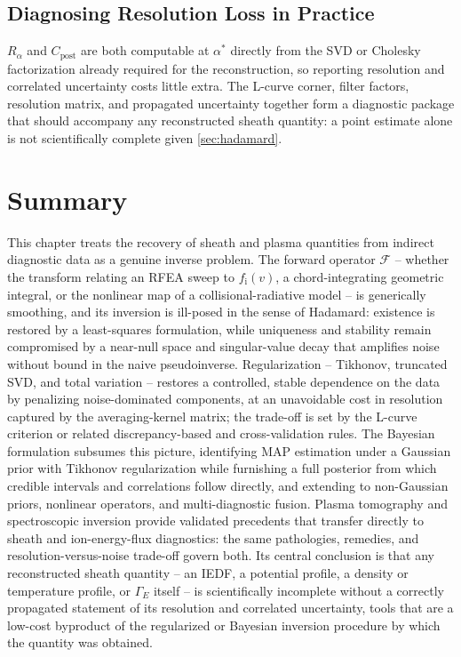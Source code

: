 \subsection{Diagnosing Resolution Loss in Practice}

$R_{\alpha}$ and $C_{\mathrm{post}}$ are both computable at $\alpha^{\ast}$ directly from the SVD or Cholesky factorization already required for the reconstruction, so reporting resolution and correlated uncertainty costs little extra. The L-curve corner, filter factors, resolution matrix, and propagated uncertainty together form a diagnostic package that should accompany any reconstructed sheath quantity: a point estimate alone is not scientifically complete given \cref{sec:hadamard}.

\section{Summary}

This chapter treats the recovery of sheath and plasma quantities from indirect diagnostic data as a genuine inverse problem. The forward operator $\mathcal{F}$ -- whether the transform relating an RFEA sweep to $f_{\mathrm{i}}(v)$, a chord-integrating geometric integral, or the nonlinear map of a collisional-radiative model -- is generically smoothing, and its inversion is ill-posed in the sense of Hadamard: existence is restored by a least-squares formulation, while uniqueness and stability remain compromised by a near-null space and singular-value decay that amplifies noise without bound in the naive pseudoinverse. Regularization -- Tikhonov, truncated SVD, and total variation -- restores a controlled, stable dependence on the data by penalizing noise-dominated components, at an unavoidable cost in resolution captured by the averaging-kernel matrix; the trade-off is set by the L-curve criterion or related discrepancy-based and cross-validation rules. The Bayesian formulation subsumes this picture, identifying MAP estimation under a Gaussian prior with Tikhonov regularization while furnishing a full posterior from which credible intervals and correlations follow directly, and extending to non-Gaussian priors, nonlinear operators, and multi-diagnostic fusion. Plasma tomography and spectroscopic inversion provide validated precedents that transfer directly to sheath and ion-energy-flux diagnostics: the same pathologies, remedies, and resolution-versus-noise trade-off govern both. Its central conclusion is that any reconstructed sheath quantity -- an IEDF, a potential profile, a density or temperature profile, or $\Gamma_{E}$ itself -- is scientifically incomplete without a correctly propagated statement of its resolution and correlated uncertainty, tools that are a low-cost byproduct of the regularized or Bayesian inversion procedure by which the quantity was obtained.

